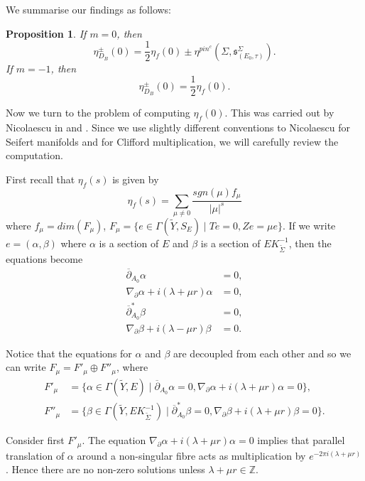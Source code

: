 \documentclass{amsart}
\newtheorem{proposition}[theorem]{Proposition}
\theoremstyle{definition}
\theoremstyle{remark}
\numberwithin{equation}{section}
\begin{document}
We summarise our findings as follows:

\begin{proposition}\label{prop:etapm}
If $m = 0$, then
\[
\eta_{D_B}^{\pm}(0) = \frac{1}{2}\eta_f(0) \pm \eta^{pin^c}( \Sigma , \mathfrak{s}_{(E_0 , \tau)}^\Sigma).
\]
If $m=-1$, then
\[
\eta_{D_B}^{\pm}(0) = \frac{1}{2}\eta_f(0).
\]
\end{proposition}

Now we turn to the problem of computing $\eta_f(0)$. This was carried out by Nicolaescu in \cite{nic} and \cite{nic2}. Since we use slightly different conventions to Nicolaescu for Seifert manifolds and for Clifford multiplication, we will carefully review the computation.

First recall that $\eta_f(s)$ is given by
\[
\eta_f(s) = \sum_{\mu \neq 0} \frac{ sgn(\mu) f_\mu }{ |\mu|^s}
\]
where $f_\mu = dim(F_\mu)$, $F_\mu = \{ e \in \Gamma(\widetilde{Y} , S_{E} ) \; | \; Te = 0, Ze = \mu e\}$. If we write $e = (\alpha , \beta)$ where $\alpha$ is a section of $E$ and $\beta$ is a section of $E K_{\widetilde{\Sigma}}^{-1}$, then the equations become
\begin{align*}
\overline{\partial}_{A_0} \alpha &= 0, \\
\nabla_{\partial} \alpha + i(\lambda + \mu r)   \alpha &= 0, \\
\overline{\partial}^*_{A_0} \beta & = 0, \\
\nabla_{\partial} \beta + i(\lambda - \mu r ) \beta & = 0. 
\end{align*}

Notice that the equations for $\alpha$ and $\beta$ are decoupled from each other and so we can write $F_\mu = F'_\mu \oplus F''_\mu$, where
\begin{align*}
F'_\mu &= \{ \alpha \in \Gamma(\widetilde{Y} , E) \; | \; \overline{\partial}_{A_0} \alpha = 0, \nabla_{\partial} \alpha + i(\lambda + \mu r)   \alpha = 0 \}, \\
F''_\mu &= \{ \beta \in \Gamma(\widetilde{Y} , EK_{\widetilde{\Sigma}}^{-1} ) \; | \; \overline{\partial}^*_{A_0} \beta = 0, \nabla_{\partial} \beta + i(\lambda + \mu r) \beta = 0 \}.
\end{align*}

Consider first $F'_\mu$. The equation $\nabla_{\partial} \alpha + i(\lambda + \mu r)   \alpha = 0$ implies that parallel translation of $\alpha$ around a non-singular fibre acts as multiplication by $e^{-2\pi i (\lambda + \mu r)}$. Hence there are no non-zero solutions unless $\lambda + \mu r \in \mathbb{Z}$.
\end{document}
